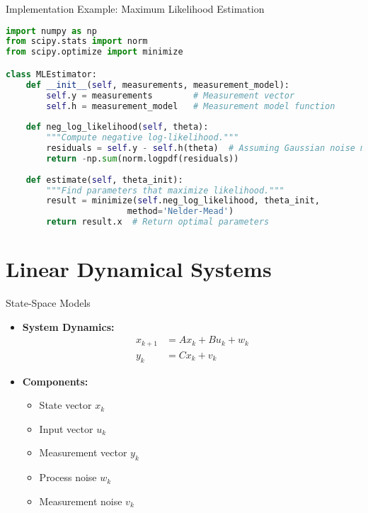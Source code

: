 \documentclass[aspectratio=169]{beamer}
\begin{document}
\begin{frame}[fragile]{Implementation Example: Maximum Likelihood Estimation}
\begin{lstlisting}[language=Python]
import numpy as np
from scipy.stats import norm
from scipy.optimize import minimize

class MLEstimator:
    def __init__(self, measurements, measurement_model):
        self.y = measurements        # Measurement vector
        self.h = measurement_model   # Measurement model function
        
    def neg_log_likelihood(self, theta):
        """Compute negative log-likelihood."""
        residuals = self.y - self.h(theta)  # Assuming Gaussian noise model
        return -np.sum(norm.logpdf(residuals))
    
    def estimate(self, theta_init):
        """Find parameters that maximize likelihood."""
        result = minimize(self.neg_log_likelihood, theta_init, 
                        method='Nelder-Mead')
        return result.x  # Return optimal parameters
\end{lstlisting}
\end{frame}

\section{Linear Dynamical Systems}

\begin{frame}{State-Space Models}
    \begin{itemize}
        \item<1-> \textbf{System Dynamics:}
            \begin{align*}
                x_{k+1} &= Ax_k + Bu_k + w_k \\
                y_k &= Cx_k + v_k
            \end{align*}
        \item<2-> \textbf{Components:}
            \begin{itemize}
                \item State vector $x_k$
                \item Input vector $u_k$
                \item Measurement vector $y_k$
                \item Process noise $w_k$
                \item Measurement noise $v_k$
            \end{itemize}
    \end{itemize}
\end{frame}
\end{document}
